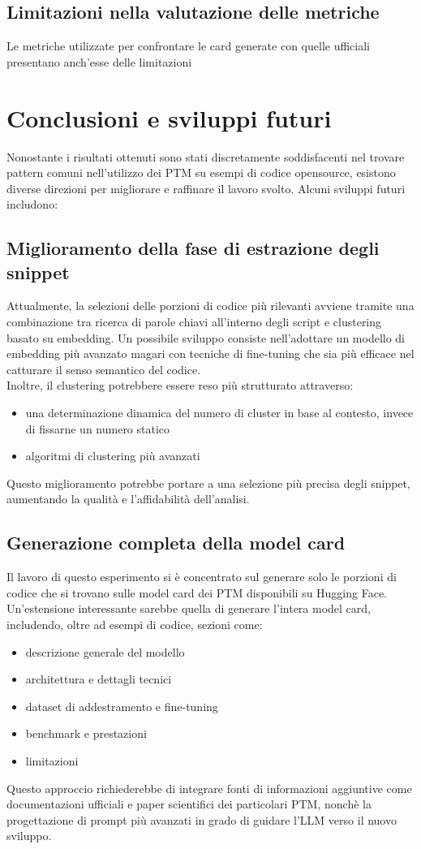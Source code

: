 \documentclass{article}
\begin{document}
\subsection{Limitazioni nella valutazione delle metriche}
Le metriche utilizzate per confrontare le card generate con quelle ufficiali presentano anch’esse delle limitazioni

\section{Conclusioni e sviluppi futuri}
Nonostante i risultati ottenuti sono stati discretamente soddisfacenti nel trovare pattern comuni nell'utilizzo dei PTM su esempi di codice opensource, esistono diverse direzioni per migliorare e raffinare il lavoro svolto. Alcuni sviluppi futuri includono:

\subsection{Miglioramento della fase di estrazione degli snippet}
Attualmente, la selezioni delle porzioni di codice più rilevanti avviene tramite una combinazione tra ricerca di parole chiavi all'interno degli script e clustering basato su embedding. Un possibile sviluppo consiste nell'adottare un modello di embedding più avanzato magari con tecniche di fine-tuning che sia più efficace nel catturare il senso semantico del codice.\\
Inoltre, il clustering potrebbere essere reso più strutturato attraverso:
\begin{itemize}
    \item una determinazione dinamica del numero di cluster in base al contesto, invece di fissarne un numero statico
    \item algoritmi di clustering più avanzati 
\end{itemize}
Questo miglioramento potrebbe portare a una selezione più precisa degli snippet, aumentando la qualità e l’affidabilità dell’analisi.

\subsection{Generazione completa della model card}
Il lavoro di questo esperimento si è concentrato sul generare solo le porzioni di codice che si trovano sulle model card dei PTM disponibili su Hugging Face. Un'estensione interessante sarebbe quella di generare l'intera model card, includendo, oltre ad esempi di codice, sezioni come:
\begin{itemize}
    \item descrizione generale del modello
    \item architettura e dettagli tecnici
    \item dataset di addestramento e fine-tuning
    \item benchmark e prestazioni
    \item limitazioni
\end{itemize}
Questo approccio richiederebbe di integrare fonti di informazioni aggiuntive come documentazioni ufficiali e paper scientifici dei particolari PTM, nonchè la progettazione di prompt più avanzati in grado di guidare l'LLM verso il nuovo sviluppo.
\end{document}
